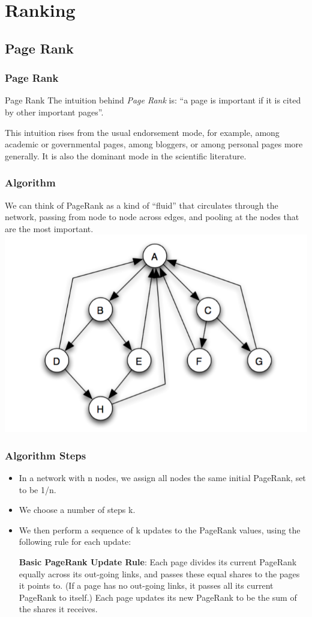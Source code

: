 \documentclass{beamer}
\begin{document}
\section{Ranking}
\subsection{Page Rank}
\begin{frame}
\frametitle{Page Rank}
\begin{block}{Page Rank}
The intuition behind \emph{Page Rank} is:
\center``a page is important if it is cited by other important pages''.
\end{block}
This intuition rises from the usual endorsement mode, for example, among academic or governmental pages, among bloggers, or among personal pages more generally. It is also the dominant mode in the scientific literature.
\end{frame}

\begin{frame}
\frametitle{Algorithm}
We can think of PageRank as a kind of “fluid” that circulates through the network, passing from node to node across edges, and pooling at the nodes that are the most important.
\center
\includegraphics[scale=0.3]{img/general_network.png} 
\end{frame}


\begin{frame}
\frametitle{Algorithm Steps}
\begin{itemize}
\item {} In a network with n nodes, we assign all nodes the same initial PageRank, set to be 1/n.
\item {} We choose a number of steps k.
\item {} We then perform a sequence of k updates to the PageRank values, using the following
rule for each update:\\
\begin{adjustwidth}{2.5em}{0pt}
\textbf{Basic PageRank Update Rule}: Each page divides its current PageRank equally across its out-going links, and passes these equal shares to the pages it points to. (If a page has no out-going links, it passes all its current PageRank to itself.) Each page updates its new PageRank to be the sum of the shares it receives.
\end{adjustwidth}
\end{itemize}
\end{frame}
\end{document}
